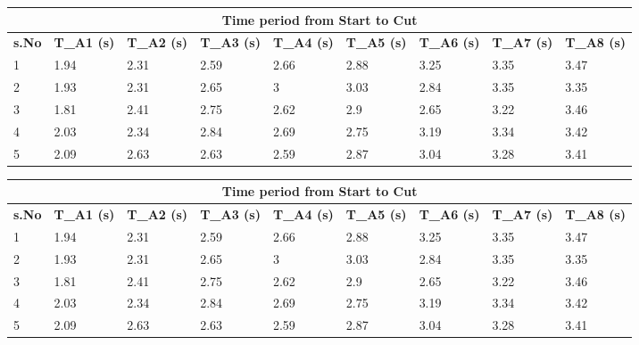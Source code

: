 \begin{center}
  

\begin{tabular}{|l|l|l|l|l|l|l|l|l|}
\hline
\multicolumn{9}{|c|}{\textbf{Time period from Start to Cut}} \\ \hline
\textbf{s.No} &
  \textbf{T\_A1 (s)} &
  \textbf{T\_A2 (s)} &
  \textbf{T\_A3 (s)} &
  \textbf{T\_A4 (s)} &
  \textbf{T\_A5 (s)} &
  \textbf{T\_A6 (s)} &
  \textbf{T\_A7 (s)} &
  \textbf{T\_A8 (s)} \\ \hline
1  & 1.94  & 2.31  & 2.59 & 2.66 & 2.88 & 3.25 & 3.35 & 3.47 \\ \hline
2  & 1.93  & 2.31  & 2.65 & 3    & 3.03 & 2.84 & 3.35 & 3.35 \\ \hline
3  & 1.81  & 2.41  & 2.75 & 2.62 & 2.9  & 2.65 & 3.22 & 3.46 \\ \hline
4  & 2.03  & 2.34  & 2.84 & 2.69 & 2.75 & 3.19 & 3.34 & 3.42 \\ \hline
5  & 2.09  & 2.63  & 2.63 & 2.59 & 2.87 & 3.04 & 3.28 & 3.41 \\ \hline
\end{tabular}
\end{center}

\begin{center}
\begin{tabular}{|l|l|l|l|l|l|l|l|l|}
\hline
\multicolumn{9}{|c|}{\textbf{Time period from Start to Cut}} \\ \hline
\textbf{s.No} &
  \textbf{T\_A1 (s)} &
  \textbf{T\_A2 (s)} &
  \textbf{T\_A3 (s)} &
  \textbf{T\_A4 (s)} &
  \textbf{T\_A5 (s)} &
  \textbf{T\_A6 (s)} &
  \textbf{T\_A7 (s)} &
  \textbf{T\_A8 (s)} \\ \hline
1  & 1.94  & 2.31  & 2.59 & 2.66 & 2.88 & 3.25 & 3.35 & 3.47 \\ \hline
2  & 1.93  & 2.31  & 2.65 & 3    & 3.03 & 2.84 & 3.35 & 3.35 \\ \hline
3  & 1.81  & 2.41  & 2.75 & 2.62 & 2.9  & 2.65 & 3.22 & 3.46 \\ \hline
4  & 2.03  & 2.34  & 2.84 & 2.69 & 2.75 & 3.19 & 3.34 & 3.42 \\ \hline
5  & 2.09  & 2.63  & 2.63 & 2.59 & 2.87 & 3.04 & 3.28 & 3.41 \\ \hline
\end{tabular}
\end{center}

